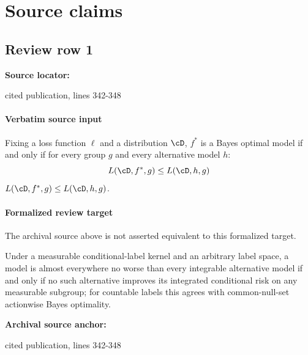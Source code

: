 \documentclass[10pt]{article}
\begin{document}
\clearpage
\hypertarget{source-claim-e8486a8a28a7a3cb}{}
\hypertarget{source-section-f10b5f68e4acf3dc}{}
\section*{Source claims}
\subsection*{Review row 1}
\textbf{Source locator:} {\footnotesize\raggedright cited publication, lines 342-\allowbreak{}348\par}
\paragraph{Verbatim source input}
\begin{ReviewVerbatim}
\begin{observation}
\label{obs:BO}
Fixing a loss function $\ell$ and a distribution $\cD$, $f^*$ is a Bayes optimal model if and only if for every group $g$ and every alternative model $h$:
\ifdraft
$$L(\cD, f^*, g) \leq L(\cD, h, g)$$
\else $L(\cD, f^*, g) \leq L(\cD, h, g)$.\fi
\end{observation}
\end{ReviewVerbatim}


\paragraph{Formalized review target}
The archival source above is not asserted equivalent to this formalized target.
\begin{ReviewVerbatim}
Under a measurable conditional-label kernel and an arbitrary label space, a model is almost everywhere no worse than every integrable alternative model if and only if no such alternative improves its integrated conditional risk on any measurable subgroup; for countable labels this agrees with common-null-set actionwise Bayes optimality.
\end{ReviewVerbatim}

\textbf{Archival source anchor:} {\footnotesize\raggedright cited publication, lines 342-\allowbreak{}348\par}
\end{document}
